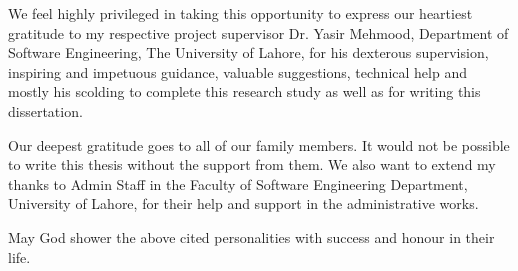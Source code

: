 We feel highly privileged in taking this opportunity to express our heartiest gratitude to my
respective project supervisor Dr. Yasir Mehmood, Department of Software Engineering, The
University of Lahore, for his dexterous supervision, inspiring and impetuous guidance, valuable
suggestions, technical help and mostly his scolding to complete this research study as well as for
writing this dissertation.


Our deepest gratitude goes to all of our family members. It would not be possible to write this thesis
without the support from them. We also want to extend my thanks to Admin Staff in the Faculty of
Software Engineering Department, University of Lahore, for their help and support in the
administrative works.


May God shower the above cited personalities with success and honour in their life.

\newpage

